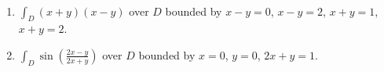 \begin{exercise}
$\text{ }$

    \begin{enumerate}
        \item $\int_D(x+y)(x-y)$ over $D$ bounded by $x - y = 0$, $x - y = 2$, $x + y = 1$, $x + y = 2$. 
        \item $\int_D \sin\left( \frac{2x-y}{2x+y} \right)$ over $D$ bounded by $x = 0$, $y = 0$, $2x + y = 1$. 
    \end{enumerate}
\end{exercise}
